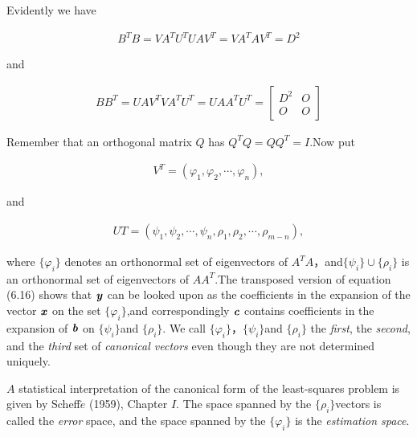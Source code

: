\begin{flushleft}
	Evidently we have
\end{flushleft}
\begin{align}
B^{T}B=VA^{T}U^{T}UAV^{T}=VA^{T}AV^{T}=D^{2}
\end{align}
\begin{flushleft}
	and
\end{flushleft}
\begin{align}
BB^{T}=UAV^{T}VA^{T}U^{T}=UAA^{T}U^{T}=
\begin{bmatrix}
D^{2} & \textit{O} \\
\textit{O} & \textit{O}
\end{bmatrix}
\end{align}
\begin{flushleft}
	Remember that an orthogonal matrix $Q$ has $ Q^{T}Q=QQ^{T}=I$.Now put
\end{flushleft}
\begin{align}
V^{T}=(\varphi_{1},\varphi_{2},\cdots,\varphi_{n}),
\end{align}
\begin{flushleft}
	and
\end{flushleft}
\begin{align}
UT=(\psi_{1},\psi_{2},\cdots,\psi_{n},\rho_{1},\rho_{2},\cdots,\rho_{m-n}),
\end{align}

\begin{flushleft}
	where  $ \{ \varphi_{i} \}  $ denotes an orthonormal set of eigenvectors of $ A^{T}A $，and$ \{\psi_{i}\}\cup\{\rho_{i}\}$ is an orthonormal set of eigenvectors of $AA^{T}$.The transposed version of equation (6.16) shows that $\textbf{\textit{y}}$ can be looked upon as the coefficients in the expansion of the vector $\textbf{\textit{x}}$ on the set $\{\varphi_{i}\}$,and correspondingly $\textbf{\textit{c}}$ contains coefficients in the expansion of $\textbf{\textit{b}}$ on $ \{\psi_{i}\} $and $ \{\rho_{i}\} $. We call $ \{\varphi_{i}\} $，$ \{\psi_{i}\} $and $ \{\rho_{i}\} $ the \textit{first}, the \textit{second}, and the \textit{third} set of \textit{canonical vectors} even though they are not determined uniquely.
\end{flushleft}

$A$ statistical interpretation of the canonical form of the least-squares problem is given by Scheff$\acute{e}$ (1959), Chapter $I$. The space spanned by the  $ \{\rho_{i}\} $vectors is called the \textit{error} space, and the space spanned by the $ \{\varphi_{i}\} $ is the \textit{estimation space}.

